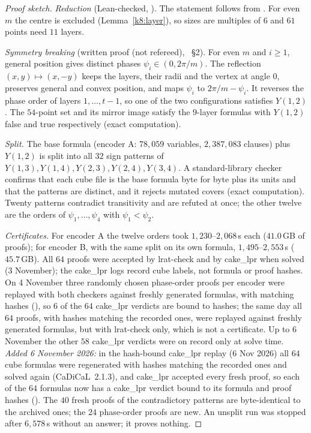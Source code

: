 \begin{proof}[Proof sketch]
\emph{Reduction} (Lean-checked, ). The statement follows from . For even $m$ the
centre is excluded (Lemma~\ref{k8:layer}), so sizes are multiples of $6$ and $61$ points need $11$ layers.

\emph{Symmetry breaking} (written proof (not refereed), ~\S2). For even $m$ and $i\ge1$, general position
gives distinct phases $\psi_i\in(0,2\pi/m)$. The reflection $(x,y)\mapsto(x,-y)$ keeps the layers, their radii and the
vertex at angle $0$, preserves general and convex position, and maps $\psi_i$ to $2\pi/m-\psi_i$. It reverses the phase
order of layers $1,\dots,t-1$, so one of the two configurations satisfies $Y(1,2)$. The $54$-point set and its mirror
image satisfy the $9$-layer formulas with $Y(1,2)$ false and true respectively (exact computation).

\emph{Split.} The base formula (encoder A: $78{,}059$ variables, $2{,}387{,}083$ clauses) plus $Y(1,2)$ is split into
all $32$ sign patterns of $Y(1,3),Y(1,4),Y(2,3),Y(2,4),Y(3,4)$. A standard-library checker confirms that each cube file
is the base formula byte for byte plus its units and that the patterns are distinct, and it rejects mutated covers
(exact computation). Twenty patterns contradict transitivity and are refuted at once; the other twelve are the orders of
$\psi_1,\dots,\psi_4$ with $\psi_1<\psi_2$.

\emph{Certificates.} For encoder A the twelve orders took $1{,}230$--$2{,}068$\,s each ($41.0$\,GB of proofs); for
encoder B, with the same split on its own formula, $1{,}495$--$2{,}553$\,s ($45.7$\,GB). All $64$ proofs were accepted
by lrat-check and by cake\_lpr when solved (3 November); the cake\_lpr logs record cube labels, not formula or proof
hashes. On 4 November three randomly chosen phase-order proofs per encoder were replayed with both checkers against
freshly generated formulas, with matching hashes (), so $6$ of the $64$ cake\_lpr verdicts are bound
to hashes; the same day all $64$ proofs, with hashes matching the recorded ones, were replayed against freshly generated
formulas, but with lrat-check only, which is not a certificate. Up to 6 November the other $58$ cake\_lpr verdicts were
on record only at solve time. \emph{Added 6 November 2026:} in the hash-bound cake\_lpr replay (6 Nov 2026) all $64$
cube formulas were regenerated with hashes matching the recorded ones and solved again (CaDiCaL~2.1.3), and cake\_lpr
accepted every fresh proof, so each of the $64$ formulas now has a cake\_lpr verdict bound to its formula and proof
hashes (). The $40$ fresh proofs of the contradictory patterns are byte-identical to the
archived ones; the $24$ phase-order proofs are new. An unsplit run was stopped after $6{,}578$\,s without an answer; it proves
nothing.


\end{proof}
